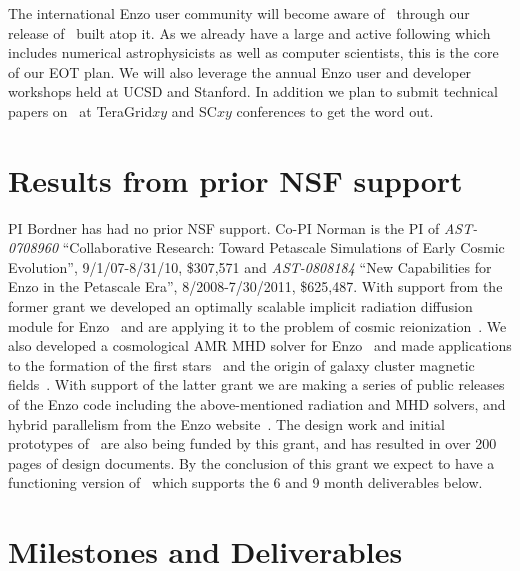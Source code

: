 \documentclass[11pt,letterpaper]{article}
\begin{document}
 The international 
Enzo user community will become aware of \cello\ through our release
of \enzoii\ built atop it. As we already have a large and active following
which includes numerical astrophysicists as well as computer scientists,
this is the core of our EOT plan. We will also leverage the annual
Enzo user and developer workshops held at UCSD and Stanford. In addition we
plan to submit technical papers on \cello\ at TeraGrid$xy$ and SC$xy$ conferences
to get the word out. 

\section{Results from prior NSF support} \label{s:prior-support}

PI Bordner has had no prior NSF support. Co-PI Norman is the PI of
\textit{AST-0708960} ``Collaborative Research: Toward Petascale
Simulations of Early Cosmic Evolution'', 9/1/07-8/31/10, \$307,571 and
\textit{AST-0808184} ``New Capabilities for Enzo in the Petascale
Era'', 8/2008-7/30/2011, \$625,487.  With support from the former
grant we developed an optimally scalable implicit radiation diffusion
module for Enzo~\cite{Iliev09,Reynolds09} and are applying it to the
problem of cosmic reionization~\cite{Norman09}.  We also developed a
cosmological AMR MHD solver for Enzo~\cite{Collins10} and made
applications to the formation of the first stars~\cite{Xu08b} and the
origin of galaxy cluster magnetic fields~\cite{Xu08a,Xu09}.  With
support of the latter grant we are making a series of public releases
of the Enzo code including the above-mentioned radiation and MHD
solvers, and hybrid parallelism from the Enzo website~\cite{wwwenzo}.
The design work and initial prototypes of \cello\ are also being
funded by this grant, and has resulted in over 200 pages of design
documents. By the conclusion of this grant we expect to have a
functioning version of \cello\ which supports the 6 and 9 month
deliverables below.


\section{Milestones and Deliverables} \label{s:milestones}
\end{document}
